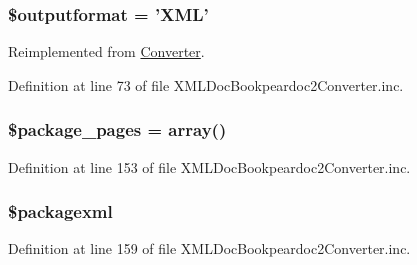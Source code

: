 \hypertarget{class_x_m_l_doc_bookpeardoc2_converter_af0bfe153c049d957e8ea29b147025108}{
\subsubsection[{\$outputformat}]{\setlength{\rightskip}{0pt plus 5cm}\$outputformat = '\-X\-M\-L'}}\label{class_x_m_l_doc_bookpeardoc2_converter_af0bfe153c049d957e8ea29b147025108}


\-Reimplemented from \hyperlink{class_converter_af0bfe153c049d957e8ea29b147025108}{\-Converter}.



\-Definition at line 73 of file \-X\-M\-L\-Doc\-Bookpeardoc2\-Converter.\-inc.

\hypertarget{class_x_m_l_doc_bookpeardoc2_converter_acb916db0304b969918dbc0de762d45e0}{
\subsubsection[{\$package\-\_\-pages}]{\setlength{\rightskip}{0pt plus 5cm}\$package\-\_\-pages = array()}}\label{class_x_m_l_doc_bookpeardoc2_converter_acb916db0304b969918dbc0de762d45e0}


\-Definition at line 153 of file \-X\-M\-L\-Doc\-Bookpeardoc2\-Converter.\-inc.

\hypertarget{class_x_m_l_doc_bookpeardoc2_converter_a0992acf5feecf128a12c3754ab95e85a}{
\subsubsection[{\$packagexml}]{\setlength{\rightskip}{0pt plus 5cm}\$packagexml}}\label{class_x_m_l_doc_bookpeardoc2_converter_a0992acf5feecf128a12c3754ab95e85a}


\-Definition at line 159 of file \-X\-M\-L\-Doc\-Bookpeardoc2\-Converter.\-inc.

